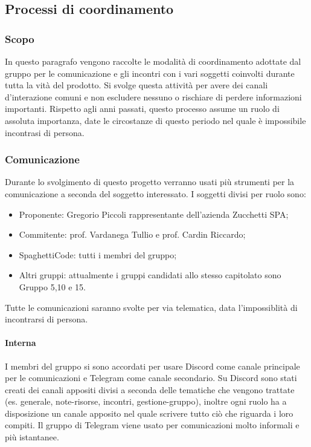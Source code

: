\documentclass[../norme_di_progetto.tex]{subfiles}
\begin{document}
\subsection{Processi di coordinamento}

    \subsubsection{Scopo}
    In questo paragrafo vengono raccolte le modalità di coordinamento adottate dal gruppo per le comunicazione e gli incontri  con i vari soggetti coinvolti durante tutta la vità del prodotto. Si svolge questa attività per avere dei canali d'interazione comuni e non escludere nessuno o rischiare di perdere informazioni importanti. Rispetto agli anni passati, questo processo assume un ruolo di assoluta importanza, date le circostanze di questo periodo nel quale è impossibile incontrasi di persona.

    \subsubsection{Comunicazione}
    Durante lo svolgimento di questo progetto verranno usati più strumenti per la comunicazione a seconda del soggetto interessato. I soggetti divisi per ruolo sono:
    \begin{itemize}
        \item Proponente: Gregorio Piccoli rappresentante dell'azienda Zucchetti SPA;
        \item Commitente: prof. Vardanega Tullio e prof. Cardin Riccardo;
        \item SpaghettiCode: tutti i membri del gruppo;
        \item Altri gruppi: attualmente i gruppi candidati allo stesso capitolato sono Gruppo 5,10 e 15.
    \end{itemize}
    Tutte le comunicazioni saranno svolte per via telematica, data l'impossiblità di incontrarsi di persona.
        \paragraph{Interna}
        I membri del gruppo si sono accordati per usare Discord come canale principale per le comunicazioni e Telegram come canale secondario. Su Discord sono stati creati dei canali appositi divisi a seconda delle tematiche che vengono trattate (es. generale, note-risorse, incontri, gestione-gruppo), inoltre ogni ruolo ha a disposizione un canale apposito nel quale scrivere tutto ciò che riguarda i loro compiti. Il gruppo di Telegram viene usato per comunicazioni molto informali e più istantanee.
\end{document}
